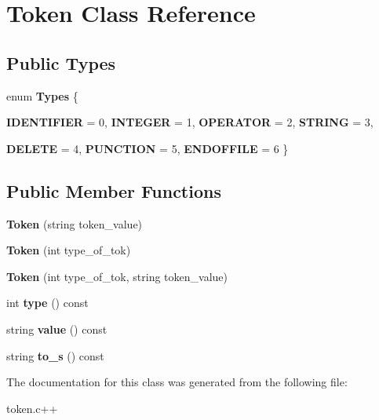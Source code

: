 \hypertarget{classToken}{
\section{Token Class Reference}
\label{classToken}
}
\subsection*{Public Types}
\begin{DoxyCompactItemize}
\item 
enum {\bfseries Types} \{ \par
{\bfseries IDENTIFIER} =  0, 
{\bfseries INTEGER} =  1, 
{\bfseries OPERATOR} =  2, 
{\bfseries STRING} =  3, 
\par
{\bfseries DELETE} =  4, 
{\bfseries PUNCTION} =  5, 
{\bfseries ENDOFFILE} =  6
 \}
\end{DoxyCompactItemize}
\subsection*{Public Member Functions}
\begin{DoxyCompactItemize}
\item 
\hypertarget{classToken_aecbb17ed64896506113b557b3fb0e497}{
{\bfseries Token} (string token\_\-value)}
\label{classToken_aecbb17ed64896506113b557b3fb0e497}

\item 
\hypertarget{classToken_a2d65336967e81971f5d59b3ef23bd264}{
{\bfseries Token} (int type\_\-of\_\-tok)}
\label{classToken_a2d65336967e81971f5d59b3ef23bd264}

\item 
\hypertarget{classToken_aba1d7c5066f3ce760f6a6b6526b09618}{
{\bfseries Token} (int type\_\-of\_\-tok, string token\_\-value)}
\label{classToken_aba1d7c5066f3ce760f6a6b6526b09618}

\item 
\hypertarget{classToken_a09c0ff9720be0b1f7592630aaea902c2}{
int {\bfseries type} () const }
\label{classToken_a09c0ff9720be0b1f7592630aaea902c2}

\item 
\hypertarget{classToken_aae6417b57687404d09cdf35a3e2efa28}{
string {\bfseries value} () const }
\label{classToken_aae6417b57687404d09cdf35a3e2efa28}

\item 
\hypertarget{classToken_af8e3abaeea6dc77de44265d5d1d52438}{
string {\bfseries to\_\-s} () const }
\label{classToken_af8e3abaeea6dc77de44265d5d1d52438}

\end{DoxyCompactItemize}


The documentation for this class was generated from the following file:\begin{DoxyCompactItemize}
\item 
token.c++\end{DoxyCompactItemize}
